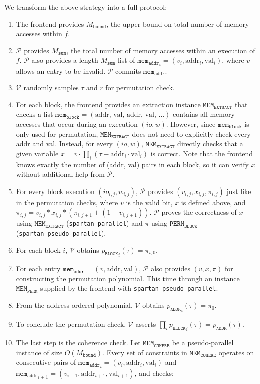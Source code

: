 \documentclass{article}
\newcommand{\code}{\texttt}
\newcommand{\Mbound}{M_{\mathtt{bound}}}
\newcommand{\Msum}{M_{\mathtt{sum}}}
\renewcommand{\P}{\mathcal{P}}
\newcommand{\V}{\mathcal{V}}
\newcommand{\PERMB}{\mathtt{PERM_{BLOCK}}}
\newcommand{\MEME}{\mathtt{MEM_{EXTRACT}}}
\newcommand{\MEMP}{\mathtt{MEM_{PERM}}}
\newcommand{\MEMC}{\mathtt{MEM_{COHERE}}}
\newcommand{\memb}{\mathtt{mem_{block}}}
\newcommand{\mema}{\mathtt{mem_{addr}}}
\newcommand{\addr}{\mbox{addr}}
\newcommand{\val}{\mbox{val}}
\begin{document}
We transform the above strategy into a full protocol:
\begin{enumerate}
    \item The frontend provides $\Mbound$, the upper bound on total number of memory accesses within $f$.
    \item $\P$ provides $\Msum$, the total number of memory accesses within an execution of $f$. $\P$ also provides a length-$\Msum$ list of ${\mema}_i = (v_i, \addr_i, \val_i)$, where $v$ allows an entry to be invalid. $\P$ commits $\mema$.
    \item $\V$ randomly samples $\tau$ and $r$ for permutation check.
    \item For each block, the frontend provides an extraction instance $\MEME$ that checks a list $\memb = (\mbox{addr, val, addr, val, }\dots)$ contains all memory accesses that occur during an execution $(io, w)$. However, since $\memb$ is only used for permutation, $\MEME$ does not need to explicitly check every addr and val. Instead, for every $(io, w)$, $\MEME$ directly checks that a given variable $x = v\cdot \prod_i (\tau - \addr_i \cdot \val_i)$ is correct. Note that the frontend knows exactly the number of (addr, val) pairs in each block, so it can verify $x$ without additional help from $\P$.
    \item For every block execution $(io_{i, j}, w_{i, j})$, $\P$ provides $(v_{i, j}, x_{i, j}, \pi_{i, j})$ just like in the permutation checks, where $v$ is the valid bit, $x$ is defined above, and $\pi_{i, j} = v_{i, j} * x_{i, j} * (\pi_{i, j+1} + (1 - v_{i, j+1}))$. $\P$ proves the correctness of $x$ using $\MEME$ (\code{spartan\_parallel}) and $\pi$ using $\PERMB$ (\code{spartan\_pseudo\_parallel}).
    \item For each block $i$, $\V$ obtains ${p_\mathtt{BLOCK}}_i(\tau) = \pi_{i, 0}$.
    \item For each entry $\mema = (v, \addr, \val)$, $\P$ also provides $(v, x, \pi)$ for constructing the permutation polynomial. This time through an instance $\MEMP$ supplied by the frontend with \code{spartan\_pseudo\_parallel}.
    \item From the address-ordered polynomial, $\V$ obtains ${p_\mathtt{ADDR}}_i(\tau) = \pi_0$.
    \item To conclude the permutation check, $\V$ asserts $\prod_i {p_\mathtt{BLOCK}}_i(\tau) = p_\mathtt{ADDR}(\tau)$.
    \item The last step is the coherence check. Let $\MEMC$ be a pseudo-parallel instance of size $O(\Mbound)$. Every set of constraints in $\MEMC$ operates on consecutive pairs of $\mema_i = (v_i, \addr_i, \val_i)$ and $\mema_{i+1} = (v_{i+1}, \addr_{i+1}, \val_{i+1})$, and checks:

\end{enumerate}
\end{document}
